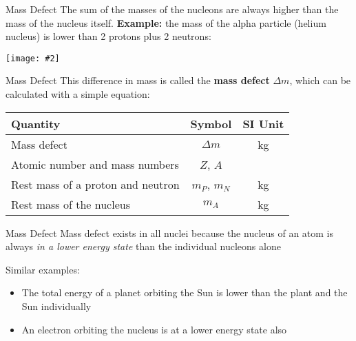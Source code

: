 \documentclass[12pt,compress,aspectratio=169]{beamer}
\newcommand{\pic}[2]{\texttt{[image: \#2]}}
\newcommand{\eq}[2]{
  \vspace{#1}{\Large\begin{displaymath}#2\end{displaymath}}
}
\begin{document}
\begin{frame}{Mass Defect}
  The sum of the masses of the nucleons are always higher than the mass of the
  nucleus itself. \textbf{Example:} the mass of the alpha particle (helium
  nucleus) is lower than 2 protons plus 2 neutrons:
  \begin{center}
    \pic{.45}{graphics/nucbind}
  \end{center}

\end{frame}



%



\begin{frame}{Mass Defect}
  This difference in mass is called the \textbf{mass defect} $\Delta m$, which
  can be calculated with a simple equation:
  
  \eq{-.2in}{
    \boxed{
      \Delta m=\left[Zm_P+(A-Z)m_N\right]-m_A
    }
  }
  \begin{center}
    \begin{tabular}{l|c|c}
      \rowcolor{pink}
      \textbf{Quantity}        & \textbf{Symbol} & \textbf{SI Unit} \\ \hline
      Mass defect              & $\Delta m$ & \si{\kilo\gram}\\
      Atomic number and mass numbers & $Z$, $A$ & \\
      Rest mass of a proton and neutron & $m_P$, $m_N$ & \si{\kilo\gram}\\
      Rest mass of the nucleus & $m_A$ & \si{\kilo\gram}\\
    \end{tabular}
  \end{center}
\end{frame}



\begin{frame}{Mass Defect}
  Mass defect exists in all nuclei because the nucleus of an atom is always
  \emph{in a lower energy state} than the individual nucleons alone
  
  \vspace{.25in}Similar examples:
  \begin{itemize}
  \item The total energy of a planet orbiting the Sun is lower than the plant
    and the Sun individually
  \item An electron orbiting the nucleus is at a lower energy state also
  \end{itemize}
\end{frame}
\end{document}
